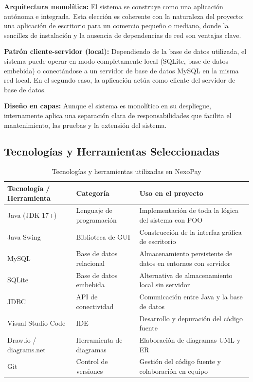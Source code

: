 \documentclass[12pt,a4paper]{report}
\begin{document}
\textbf{Arquitectura monolítica:} El sistema se construye como una aplicación autónoma e integrada. Esta elección es coherente con la naturaleza del proyecto: una aplicación de escritorio para un comercio pequeño o mediano, donde la sencillez de instalación y la ausencia de dependencias de red son ventajas clave.

\textbf{Patrón cliente-servidor (local):} Dependiendo de la base de datos utilizada, el sistema puede operar en modo completamente local (SQLite, base de datos embebida) o conectándose a un servidor de base de datos MySQL en la misma red local. En el segundo caso, la aplicación actúa como cliente del servidor de base de datos.

\textbf{Diseño en capas:} Aunque el sistema es monolítico en su despliegue, internamente aplica una separación clara de responsabilidades que facilita el mantenimiento, las pruebas y la extensión del sistema.

\subsection{Tecnologías y Herramientas Seleccionadas}

\begin{table}[H]
\centering
\caption{Tecnologías y herramientas utilizadas en NexoPay}
\label{tab:tecnologias}
\begin{tabular}{|p{4cm}|p{4cm}|p{6cm}|}
\hline
\textbf{Tecnología / Herramienta} & \textbf{Categoría} & \textbf{Uso en el proyecto} \\ \hline
Java (JDK 17+) & Lenguaje de programación & Implementación de toda la lógica del sistema con POO \\ \hline
Java Swing & Biblioteca de GUI & Construcción de la interfaz gráfica de escritorio \\ \hline
MySQL & Base de datos relacional & Almacenamiento persistente de datos en entornos con servidor \\ \hline
SQLite & Base de datos embebida & Alternativa de almacenamiento local sin servidor \\ \hline
JDBC & API de conectividad & Comunicación entre Java y la base de datos \\ \hline
Visual Studio Code & IDE & Desarrollo y depuración del código fuente \\ \hline
Draw.io / diagrams.net & Herramienta de diagramas & Elaboración de diagramas UML y ER \\ \hline
Git & Control de versiones & Gestión del código fuente y colaboración en equipo \\ \hline
\end{tabular}
\end{table}
\end{document}
